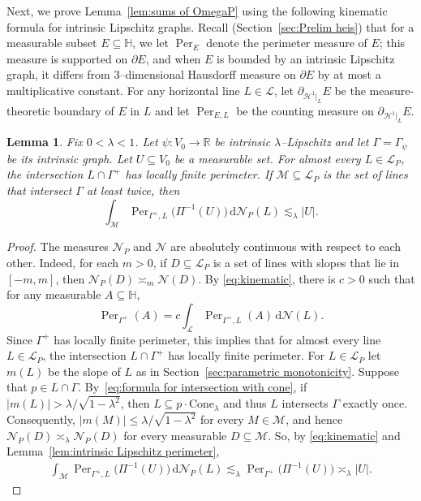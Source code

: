 \documentclass[11pt,reqno]{amsart}
\renewcommand{\H}{\mathbb{H}}
\newcommand{\R}{\mathbb{R}}
\newcommand{\cH}{\mathcal{H}}
\newcommand{\cL}{\mathcal{L}}
\newcommand{\cM}{\mathcal{M}}
\newcommand{\cN}{\mathcal{N}}
\renewcommand{\approx}{\asymp}
\newcommand{\ud}[0]{\,\mathrm{d}}
\newcommand{\0}{\mathbf{0}}
\renewcommand{\1}{\mathbf 1}
\newcommand{\from}{\colon}
\renewcommand{\subset}{\subseteq}
\renewcommand{\le}{\leqslant}
\newtheorem{lemma}[thm]{Lemma}
\theoremstyle{remark}
\DeclareMathOperator{\Per}{Per}
\begin{document}
Next, we prove Lemma~\ref{lem:sums of OmegaP} using the following kinematic formula for intrinsic Lipschitz graphs.  Recall (Section~\ref{sec:Prelim heis}) that for a measurable subset $E\subset \H$, we let $\Per_E$ denote the perimeter measure of $E$; this measure is supported on $\partial E$, and when $E$ is bounded by an intrinsic Lipschitz graph, it differs from $3$--dimensional Hausdorff measure on $\partial E$ by at most a multiplicative constant.  For any horizontal line $L\in \cL$, let $\partial_{\cH^1|_L}E$ be the measure-theoretic boundary of $E$ in $L$ and let $\Per_{E,L}$ be the counting measure on $\partial_{\cH^1|_L}E$.
\begin{lemma}\label{lem:parametric kinematic}
  Fix $0<\lambda<1$. Let $\psi\from V_0\to \R$ be intrinsic $\lambda$--Lipschitz and let $\Gamma=\Gamma_\psi$ be its intrinsic graph.  Let $U\subset V_0$ be a measurable set.  For almost every $L\in \cL_P$, the intersection $L\cap \Gamma^+$ has locally finite perimeter.  If $\cM\subset \cL_P$ is the set of lines that intersect $\Gamma$ at least twice, then
  \begin{equation}\label{eq:lesssim lambda |U|}\int_{\cM} \Per_{\Gamma^+,L}\big(\Pi^{-1}(U)\big)\ud \cN_P(L)\lesssim_\lambda |U|.\end{equation}
\end{lemma}
\begin{proof}
  The measures $\cN_P$ and $\cN$ are absolutely continuous with respect to each other.  Indeed, for each $m>0$, if $D\subset \cL_P$ is a set of lines with slopes that lie in $[-m,m]$, then $\cN_P(D)\approx_m\cN(D)$. By \eqref{eq:kinematic}, there is  $c>0$ such that for any measurable $A\subset \H$,
  $$\Per_{\Gamma^+}(A) = c \int_{\cL} \Per_{\Gamma^+,L}(A) \ud \cN(L).$$
  Since $\Gamma^+$ has locally finite perimeter, this implies that for almost every line $L\in \cL_P$, the intersection $L\cap\Gamma^+$ has locally finite perimeter. For $L\in \cL_P$ let $m(L)$ be the slope of $L$ as in Section~\ref{sec:parametric monotonicity}. Suppose that $p\in L\cap \Gamma$.  By~\eqref{eq:formula for intersection with cone},  if $|m(L)|> \lambda/\sqrt{1-\lambda^2}$, then $L\subset p\cdot \mathrm{Cone}_\lambda$ and thus $L$ intersects $\Gamma$ exactly once.  Consequently, $|m(M)|\le \lambda/\sqrt{1-\lambda^2}$ for every $M\in \cM$, and hence $\cN_P(D)\approx_\lambda \cN_P(D)$ for every measurable $D\subset \cM$. So, by \eqref{eq:kinematic} and Lemma~\ref{lem:intrinsic Lipschitz perimeter},
  \begin{align*}
    \int_{\cM} \Per_{\Gamma^+,L}\big(\Pi^{-1}(U)\big)\ud \cN_P(L)
     \lesssim_\lambda \Per_{\Gamma^+}\big(\Pi^{-1}(U)\big) \approx_\lambda |U|.\tag*{\qedhere}
  \end{align*}
\end{proof}
\end{document}
